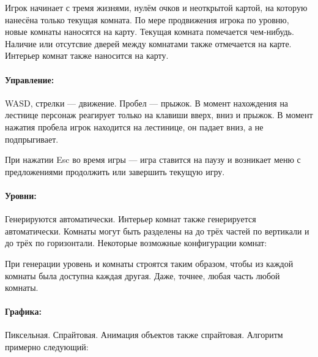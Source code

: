 \documentclass[12pt,a4paper]{article}
\begin{document}
Игрок начинает с тремя жизнями, нулём очков и неоткрытой картой, на которую нанесёна только текущая комната. По мере продвижения игрока по уровню, новые комнаты наносятся на карту. Текущая комната помечается чем-нибудь. Наличие или отсутсвие дверей между комнатами также отмечается на карте. Интерьер комнат также наносится на карту.
\paragraph{Управление:}
WASD, стрелки --- движение. Пробел --- прыжок. В момент нахождения на лестнице персонаж реагирует только на клавиши вверх, вниз и прыжок. В момент нажатия пробела игрок находится на лестинице, он падает вниз, а не подпрыгивает.

При нажатии Esc во время игры --- игра ставится на паузу и возникает меню с предложениями продолжить или завершить текущую игру.
\paragraph{Уровни:}
Генерируются автоматически. Интерьер комнат также генерируется автоматически.
Комнаты могут быть разделены на до трёх частей по вертикали и до трёх по горизонтали. Некоторые возможные конфигурации комнат:

При генерации уровень и комнаты строятся таким образом, чтобы из каждой комнаты была доступна каждая другая. Даже, точнее, любая часть любой комнаты.
\paragraph{Графика:}
Пиксельная. Спрайтовая. Анимация объектов также спрайтовая. Алгоритм примерно следующий:
\end{document}
